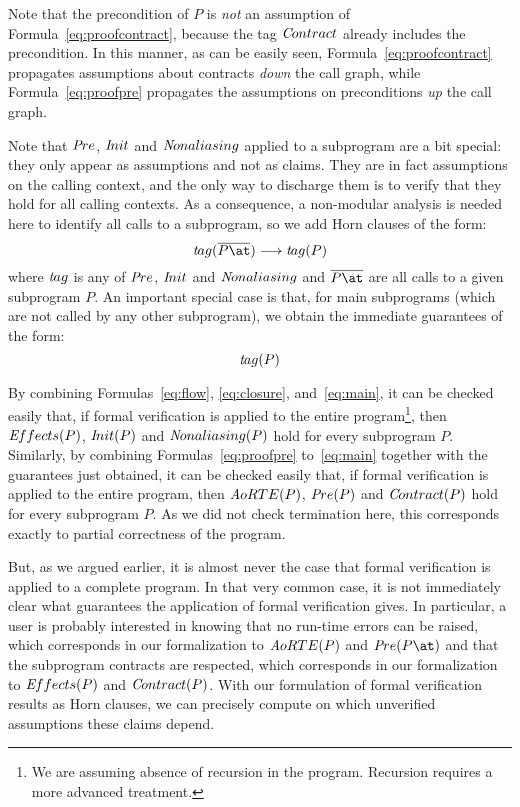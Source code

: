 \documentclass{llncs}
\begin{document}
Note that the precondition of $P$ is {\em not} an assumption of
Formula~\ref{eq:proofcontract}, because the tag ${\textit Contract}$ already
includes the precondition. In this manner, as can be easily seen,
Formula~\ref{eq:proofcontract} propagates assumptions about contracts {\em
down} the call graph, while Formula~\ref{eq:proofpre} propagates the
assumptions on preconditions {\em up} the call graph.

Note that ${\textit Pre}$, ${\textit Init}$ and ${\textit
Nonaliasing}$ applied to a subprogram are a bit special: they only appear as assumptions and not as
claims. They are in fact assumptions on the calling context, and the only
way to discharge them is to verify that they hold for all calling contexts. As a consequence,
a non-modular analysis is needed here to identify all calls to a subprogram,
so we add Horn clauses of the form:
\begin{equation}
{ \textit tag}(\overline{P\at}) \longrightarrow {\textit tag}(P)
\label{eq:closure}
\end{equation}
where ${\textit tag}$ is any of ${\textit Pre}$, ${\textit Init}$ and ${\textit
Nonaliasing}$ and $\overline{P\at}$ are all calls to a given subprogram $P$.
An important special case is that, for main subprograms (which are not called
by any other subprogram), we obtain the immediate guarantees of the form:
\begin{equation}
 {\textit tag}(P)
\label{eq:main}
\end{equation}

By combining Formulas~\ref{eq:flow}, \ref{eq:closure}, and~\ref{eq:main}, it
can be checked easily that, if formal verification is applied to the entire
program\footnote{We are assuming absence of recursion in the program.
Recursion requires a more advanced treatment.}, then ${\textit Effects}(P)$,
${\textit Init}(P)$ and ${\textit Nonaliasing}(P)$ hold for every subprogram
$P$. Similarly, by combining Formulas~\ref{eq:proofpre} to~\ref{eq:main}
together with the guarantees just obtained, it can be checked easily that, if
formal verification is applied to the entire program, then ${\textit
AoRTE}(P)$, ${\textit Pre}(P)$ and ${\textit Contract}(P)$ hold for every
subprogram $P$. As we did not check termination here, this corresponds exactly
to partial correctness of the program.

But, as we argued earlier, it is almost never the case that formal verification
is applied to a complete program. In that very common case, it is not
immediately clear what guarantees the application of formal verification
gives. In particular, a user is probably interested in knowing that no run-time
errors can be raised, which corresponds in our formalization to ${\textit
  AoRTE}(P)$ and ${\textit Pre}(P\at)$ and that the subprogram contracts are respected, which corresponds in our formalization
to ${\textit Effects}(P)$ and ${\textit Contract}(P)$. With our formulation of
formal verification results as Horn clauses, we can precisely compute on which
unverified assumptions these claims depend.
\end{document}
